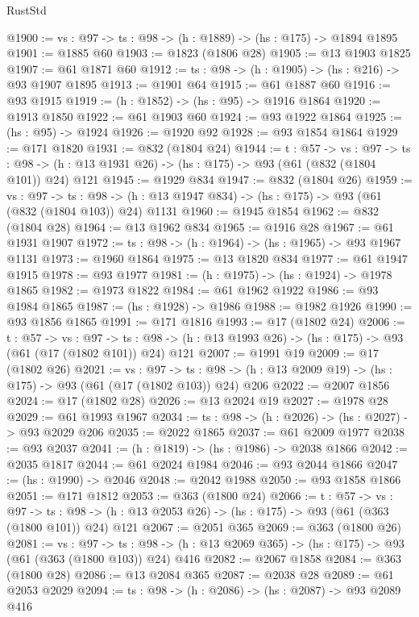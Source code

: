 \begin{lexlean}{RustStd}
\begin{coremodule}
@1900 := {vs : @97} -> {ts : @98} -> (h : @1889) -> (hs : @175) -> @1894 @1895
@1901 := @1885 @60
@1903 := @1823 (@1806 @28)
@1905 := @13 @1903 @1825
@1907 := @61 @1871 @60
@1912 := {ts : @98} -> (h : @1905) -> (hs : @216) -> @93 @1907 @1895
@1913 := @1901 @64
@1915 := @61 @1887 @60
@1916 := @93 @1915
@1919 := (h : @1852) -> (hs : @95) -> @1916 @1864
@1920 := @1913 @1850
@1922 := @61 @1903 @60
@1924 := @93 @1922 @1864
@1925 := (hs : @95) -> @1924
@1926 := @1920 @92
@1928 := @93 @1854 @1864
@1929 := @171 @1820
@1931 := @832 (@1804 @24)
@1944 := {t : @57} ->
  {vs : @97} ->
  {ts : @98} -> (h : @13 @1931 @26) -> (hs : @175) -> @93 (@61 (@832 (@1804 @101)) @24) @121
@1945 := @1929 @834
@1947 := @832 (@1804 @26)
@1959 := {vs : @97} ->
  {ts : @98} -> (h : @13 @1947 @834) -> (hs : @175) -> @93 (@61 (@832 (@1804 @103)) @24) @1131
@1960 := @1945 @1854
@1962 := @832 (@1804 @28)
@1964 := @13 @1962 @834
@1965 := @1916 @28
@1967 := @61 @1931 @1907
@1972 := {ts : @98} -> (h : @1964) -> (hs : @1965) -> @93 @1967 @1131
@1973 := @1960 @1864
@1975 := @13 @1820 @834
@1977 := @61 @1947 @1915
@1978 := @93 @1977
@1981 := (h : @1975) -> (hs : @1924) -> @1978 @1865
@1982 := @1973 @1822
@1984 := @61 @1962 @1922
@1986 := @93 @1984 @1865
@1987 := (hs : @1928) -> @1986
@1988 := @1982 @1926
@1990 := @93 @1856 @1865
@1991 := @171 @1816
@1993 := @17 (@1802 @24)
@2006 := {t : @57} ->
  {vs : @97} ->
  {ts : @98} -> (h : @13 @1993 @26) -> (hs : @175) -> @93 (@61 (@17 (@1802 @101)) @24) @121
@2007 := @1991 @19
@2009 := @17 (@1802 @26)
@2021 := {vs : @97} ->
  {ts : @98} -> (h : @13 @2009 @19) -> (hs : @175) -> @93 (@61 (@17 (@1802 @103)) @24) @206
@2022 := @2007 @1856
@2024 := @17 (@1802 @28)
@2026 := @13 @2024 @19
@2027 := @1978 @28
@2029 := @61 @1993 @1967
@2034 := {ts : @98} -> (h : @2026) -> (hs : @2027) -> @93 @2029 @206
@2035 := @2022 @1865
@2037 := @61 @2009 @1977
@2038 := @93 @2037
@2041 := (h : @1819) -> (hs : @1986) -> @2038 @1866
@2042 := @2035 @1817
@2044 := @61 @2024 @1984
@2046 := @93 @2044 @1866
@2047 := (hs : @1990) -> @2046
@2048 := @2042 @1988
@2050 := @93 @1858 @1866
@2051 := @171 @1812
@2053 := @363 (@1800 @24)
@2066 := {t : @57} ->
  {vs : @97} ->
  {ts : @98} -> (h : @13 @2053 @26) -> (hs : @175) -> @93 (@61 (@363 (@1800 @101)) @24) @121
@2067 := @2051 @365
@2069 := @363 (@1800 @26)
@2081 := {vs : @97} ->
  {ts : @98} -> (h : @13 @2069 @365) -> (hs : @175) -> @93 (@61 (@363 (@1800 @103)) @24) @416
@2082 := @2067 @1858
@2084 := @363 (@1800 @28)
@2086 := @13 @2084 @365
@2087 := @2038 @28
@2089 := @61 @2053 @2029
@2094 := {ts : @98} -> (h : @2086) -> (hs : @2087) -> @93 @2089 @416

\end{coremodule}
\end{lexlean}
